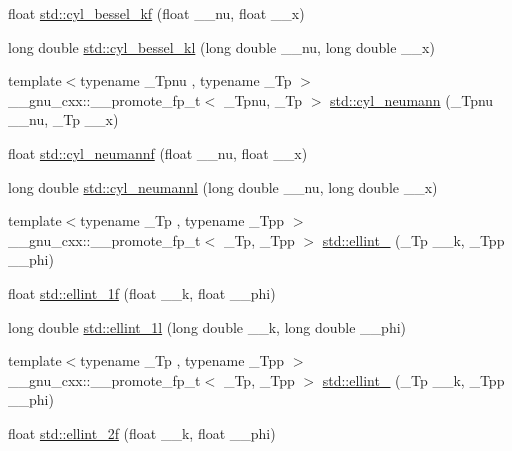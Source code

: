 \begin{DoxyCompactItemize}
\item 
float \hyperlink{group__tr29124__math__spec__func_ga1f50047f9aab0ec8b1a1615fe9fbe32f}{std\+::cyl\+\_\+bessel\+\_\+kf} (float \+\_\+\+\_\+nu, float \+\_\+\+\_\+x)
\item 
long double \hyperlink{group__tr29124__math__spec__func_gac35194b926270d7857d651e06198c7d3}{std\+::cyl\+\_\+bessel\+\_\+kl} (long double \+\_\+\+\_\+nu, long double \+\_\+\+\_\+x)
\item 
{\footnotesize template$<$typename \+\_\+\+Tpnu , typename \+\_\+\+Tp $>$ }\\\+\_\+\+\_\+gnu\+\_\+cxx\+::\+\_\+\+\_\+promote\+\_\+fp\+\_\+t$<$ \+\_\+\+Tpnu, \+\_\+\+Tp $>$ \hyperlink{group__tr29124__math__spec__func_gaa5720700a9d1c33f30b53c6b30ec3260}{std\+::cyl\+\_\+neumann} (\+\_\+\+Tpnu \+\_\+\+\_\+nu, \+\_\+\+Tp \+\_\+\+\_\+x)
\item 
float \hyperlink{group__tr29124__math__spec__func_ga604c13e8f2bb7cd3c7c91d8b19d6b13a}{std\+::cyl\+\_\+neumannf} (float \+\_\+\+\_\+nu, float \+\_\+\+\_\+x)
\item 
long double \hyperlink{group__tr29124__math__spec__func_gaf8986bae9a523c48d861d233835bda8f}{std\+::cyl\+\_\+neumannl} (long double \+\_\+\+\_\+nu, long double \+\_\+\+\_\+x)
\item 
{\footnotesize template$<$typename \+\_\+\+Tp , typename \+\_\+\+Tpp $>$ }\\\+\_\+\+\_\+gnu\+\_\+cxx\+::\+\_\+\+\_\+promote\+\_\+fp\+\_\+t$<$ \+\_\+\+Tp, \+\_\+\+Tpp $>$ \hyperlink{group__tr29124__math__spec__func_ga8be90518215c6209679785e5444ee0af}{std\+::ellint\+\_} (\+\_\+\+Tp \+\_\+\+\_\+k, \+\_\+\+Tpp \+\_\+\+\_\+phi)
\item 
float \hyperlink{group__tr29124__math__spec__func_ga308d23d70f4b5e848eb7a4173628ef3b}{std\+::ellint\+\_\+1f} (float \+\_\+\+\_\+k, float \+\_\+\+\_\+phi)
\item 
long double \hyperlink{group__tr29124__math__spec__func_ga795383fa51e02351000b410b478d824f}{std\+::ellint\+\_\+1l} (long double \+\_\+\+\_\+k, long double \+\_\+\+\_\+phi)
\item 
{\footnotesize template$<$typename \+\_\+\+Tp , typename \+\_\+\+Tpp $>$ }\\\+\_\+\+\_\+gnu\+\_\+cxx\+::\+\_\+\+\_\+promote\+\_\+fp\+\_\+t$<$ \+\_\+\+Tp, \+\_\+\+Tpp $>$ \hyperlink{group__tr29124__math__spec__func_ga6db0d1043cad03894edb7def7b70bc39}{std\+::ellint\+\_} (\+\_\+\+Tp \+\_\+\+\_\+k, \+\_\+\+Tpp \+\_\+\+\_\+phi)
\item 
float \hyperlink{group__tr29124__math__spec__func_ga594a730163c6228c75b152462700062b}{std\+::ellint\+\_\+2f} (float \+\_\+\+\_\+k, float \+\_\+\+\_\+phi)

\end{DoxyCompactItemize}
